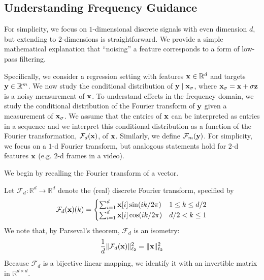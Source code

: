 \subsection{Understanding Frequency Guidance}
\label{app:frequency_guidance}

\newcommand{\bSigma}{\bm{\Sigma}}
\newcommand{\eye}{\mathbf{I}}
\newcommand{\bhatx}{\hat{\bx}}
\newcommand{\bA}{\mathbf{A}}
\newcommand{\bS}{\mathbf{S}}

\newcommand{\Four}[1][d]{\mathcal{F}_{#1}}
\newcommand{\R}{\mathbb{R}}
For simplicity, we focus on $1$-dimensional discrete signals with even dimension $d$, but extending to $2$-dimensions is straightforward. We provide a simple mathematical explanation that ``noising'' a feature corresponds to a form of low-pass filtering.

Specifically, we consider a regression setting with features $\bx \in \R^d$ and targets $\by \in \R^m$. We now study the conditional distribution of $\mathbf{y} \mid {\mathbf{x}}_{\sigma}$, where ${\mathbf{x}}_{\sigma} = {\mathbf{x}} + \sigma \mathbf{z}$ is a noisy measurement of ${\mathbf{x}}$. To understand effects in the frequency domain, we study the conditional distribution of the Fourier transform of $\mathbf{y}$  given a measurement of ${\mathbf{x}}_{\sigma}$. We assume that the entries of ${\mathbf{x}}$ can be interpreted as entries in a sequence and we interpret this conditional distribution as a function of the Fourier transformation, $\Four(\bx)$, of ${\mathbf{x}}$. Similarly, we define $\Four[m](\by)$. For simplicity, we focus on a $1$-d Fourier transform, but analogous statements hold for $2$-d features ${\mathbf{x}}$ (e.g. $2$-d frames in a video).


We begin by recalling the Fourier transform of a vector. %
\begin{definition} Let $\Four: \R^d \to \R^d$ denote the (real) discrete Fourier transform, specified by 
\begin{align}
    \Four(\bx)(k) = 
\begin{cases}\sum_{i=1}^d \bx[i]\sin(ik/2\pi) & 1 \le k \le d/2\\
    \sum_{i=1}^d \bx[i]\cos(ik/2\pi) & d/2 < k \le 1\\
    \end{cases}
\end{align}
We note that, by Parseval's theorem, $\Four$ is an isometry:
\begin{align}
    \frac{1}{d}\|\Four(\bx)\|_{\ell_2}^2 = \|\bx\|_{\ell_2}^2
\end{align}
Because $\Four$ is a bijective linear mapping, we identify it with an invertible matrix in $\R^{d \times d}$. 
\end{definition}
\newcommand{\Nfreq}{\cN_{\mathrm{freq}}}

